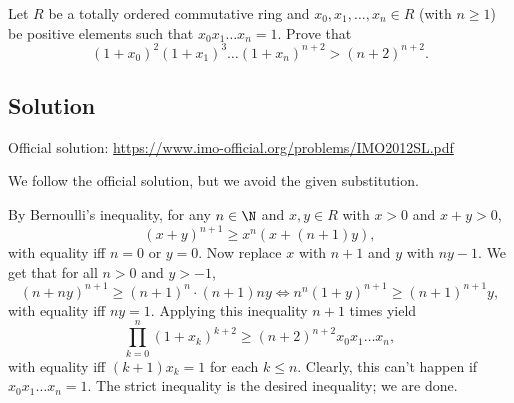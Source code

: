 Let $R$ be a totally ordered commutative ring and $x_0, x_1, \ldots, x_n \in R$ (with $n \geq 1$) be positive elements such that $x_0 x_1 \ldots x_n = 1$.
Prove that \[ (1 + x_0)^2 (1 + x_1)^3 \ldots (1 + x_n)^{n + 2} > (n + 2)^{n + 2}. \]



\subsection*{Solution}

Official solution: \url{https://www.imo-official.org/problems/IMO2012SL.pdf}

We follow the official solution, but we avoid the given substitution.

By Bernoulli's inequality, for any $n \in \N$ and $x, y \in R$ with $x > 0$ and $x + y > 0$,
\[ (x + y)^{n + 1} \geq x^n (x + (n + 1) y), \]
    with equality iff $n = 0$ or $y = 0$.
Now replace $x$ with $n + 1$ and $y$ with $ny - 1$.
We get that for all $n > 0$ and $y > -1$,
\[ (n + ny)^{n + 1} \geq (n + 1)^n \cdot (n + 1) ny \iff n^n (1 + y)^{n + 1} \geq (n + 1)^{n + 1} y, \]
    with equality iff $ny = 1$.
Applying this inequality $n + 1$ times yield
\[ \prod_{k = 0}^n (1 + x_k)^{k + 2} \geq (n + 2)^{n + 2} x_0 x_1 \ldots x_n, \]
    with equality iff $(k + 1) x_k = 1$ for each $k \leq n$.
Clearly, this can't happen if $x_0 x_1 \ldots x_n = 1$.
The strict inequality is the desired inequality; we are done.
